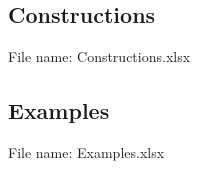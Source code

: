 \documentclass[12pt,a4paper]{scrartcl}
\begin{document}
\newpage%
\subsection{Constructions}

File name: Constructions.xlsx

\noindent{}

\newpage%
\subsection{Examples}

File name: Examples.xlsx

\noindent{}
\end{document}

